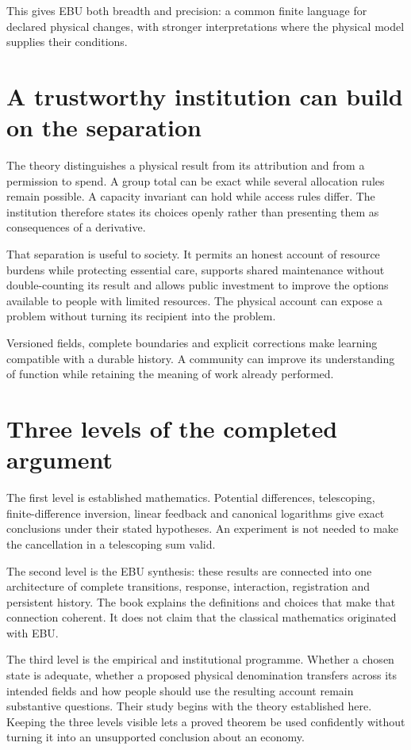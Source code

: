 This gives EBU both breadth and precision: a common finite language for declared physical changes, with stronger interpretations where the physical model supplies their conditions.

\section{A trustworthy institution can build on the separation}
The theory distinguishes a physical result from its attribution and from a permission to spend. A group total can be exact while several allocation rules remain possible. A capacity invariant can hold while access rules differ. The institution therefore states its choices openly rather than presenting them as consequences of a derivative.

That separation is useful to society. It permits an honest account of resource burdens while protecting essential care, supports shared maintenance without double-counting its result and allows public investment to improve the options available to people with limited resources. The physical account can expose a problem without turning its recipient into the problem.

Versioned fields, complete boundaries and explicit corrections make learning compatible with a durable history. A community can improve its understanding of function while retaining the meaning of work already performed.

\section{Three levels of the completed argument}
The first level is established mathematics. Potential differences, telescoping, finite-difference inversion, linear feedback and canonical logarithms give exact conclusions under their stated hypotheses. An experiment is not needed to make the cancellation in a telescoping sum valid.

The second level is the EBU synthesis: these results are connected into one architecture of complete transitions, response, interaction, registration and persistent history. The book explains the definitions and choices that make that connection coherent. It does not claim that the classical mathematics originated with EBU.

The third level is the empirical and institutional programme. Whether a chosen state is adequate, whether a proposed physical denomination transfers across its intended fields and how people should use the resulting account remain substantive questions. Their study begins with the theory established here. Keeping the three levels visible lets a proved theorem be used confidently without turning it into an unsupported conclusion about an economy.


